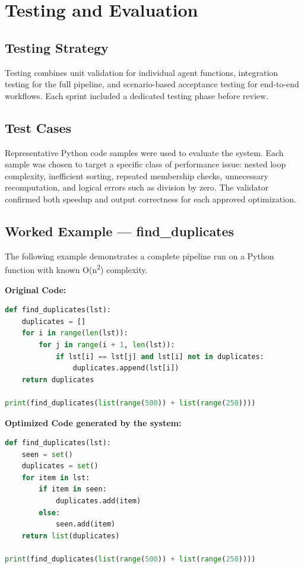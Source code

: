 \clearpage
\section{Testing and Evaluation}
\label{sec:testing}

\subsection{Testing Strategy}
Testing combines unit validation for individual agent functions, integration testing for the full pipeline, and scenario-based acceptance testing for end-to-end workflows. Each sprint included a dedicated testing phase before review.

\subsection{Test Cases}
Representative Python code samples were used to evaluate the system. Each sample was chosen to target a specific class of performance issue: nested loop complexity, inefficient sorting, repeated membership checks, unnecessary recomputation, and logical errors such as division by zero. The validator confirmed both speedup and output correctness for each approved optimization.

\subsection{Worked Example — find\_duplicates}
The following example demonstrates a complete pipeline run on a Python function with known O(n\textsuperscript{2}) complexity.

\textbf{Original Code:}
\begin{lstlisting}[language=Python]
def find_duplicates(lst):
    duplicates = []
    for i in range(len(lst)):
        for j in range(i + 1, len(lst)):
            if lst[i] == lst[j] and lst[i] not in duplicates:
                duplicates.append(lst[i])
    return duplicates

print(find_duplicates(list(range(500)) + list(range(250))))
\end{lstlisting}

\textbf{Optimized Code generated by the system:}
\begin{lstlisting}[language=Python]
def find_duplicates(lst):
    seen = set()
    duplicates = set()
    for item in lst:
        if item in seen:
            duplicates.add(item)
        else:
            seen.add(item)
    return list(duplicates)

print(find_duplicates(list(range(500)) + list(range(250))))
\end{lstlisting}

